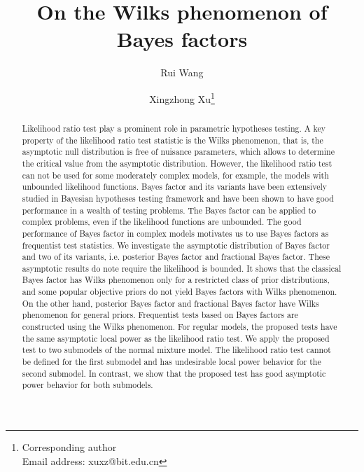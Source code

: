 \documentclass[11pt]{article}
\theoremstyle{plain}
\theoremstyle{definition}
\theoremstyle{remark}
\begin{document}
\title{On the Wilks phenomenon of Bayes factors}
\author[1]{Rui Wang}
\author[1,2]{Xingzhong Xu\thanks{Corresponding author\\Email address: xuxz@bit.edu.cn}}

\maketitle


\begin{abstract}
Likelihood ratio test play a prominent role in parametric hypotheses testing.
A key property of the likelihood ratio test statistic is the Wilks phenomenon, that is, the asymptotic null distribution is free of nuisance parameters, which allows to determine the critical value from the asymptotic distribution.
However, the likelihood ratio test can not be used for some moderately complex models, for example, the models with unbounded likelihood functions.
Bayes factor and its variants have been extensively studied in Bayesian hypotheses testing framework and have been shown to have good performance in a wealth of testing problems.
The Bayes factor can be applied to complex problems, even if the likelihood functions are unbounded.
The good performance of Bayes factor in complex models motivates us to use Bayes factors as frequentist test statistics.
We investigate the asymptotic distribution of Bayes factor and two of its variants, i.e. posterior Bayes factor and fractional Bayes factor.
These asymptotic results do note require the likelihood is bounded.
It shows that the classical Bayes factor has Wilks phenomenon only for a restricted class of prior distributions, and some popular objective priors do not yield Bayes factors with Wilks phenomenon.
On the other hand, posterior Bayes factor and fractional Bayes factor have Wilks phenomenon for general priors.
Frequentist tests based on Bayes factors are constructed using the Wilks phenomenon.
For regular models, the proposed tests have the same asymptotic local power as the likelihood ratio test.
We apply the proposed test to two submodels of the normal mixture model.
The likelihood ratio test cannot be defined for the first submodel and has undesirable local power behavior for the second submodel.
In contrast, we show that the proposed test has good asymptotic power behavior for both submodels.
\end{abstract}
\end{document}
